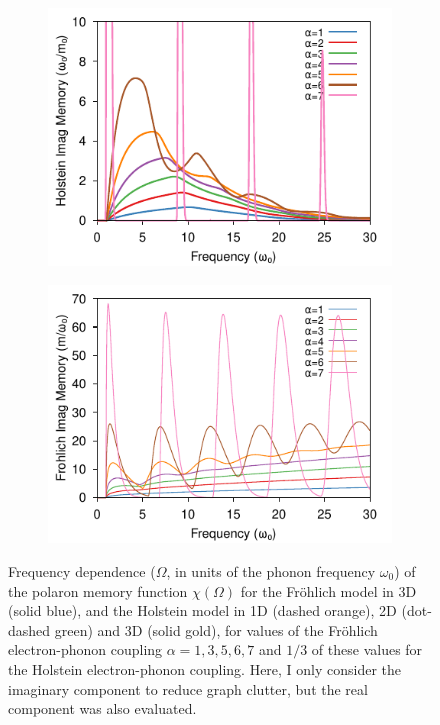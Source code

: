 \begin{figure}
\begin{subfigure}[b]{0.49\textwidth}
    \includegraphics[width=\textwidth]{figures/holstein-3d-imag-memory-freq-COLOUR.pdf}
  \end{subfigure}
  \begin{subfigure}[b]{0.49\textwidth}
    \includegraphics[width=\textwidth]{figures/frohlich-3d-imag-memory-freq-COLOUR.pdf}
  \end{subfigure}
  \caption{Frequency dependence ($\Omega$, in units of the phonon frequency $\omega_0$) of the polaron memory function $\chi(\Omega)$ for the Fr\"ohlich model in 3D (solid blue), and the Holstein model in 1D (dashed orange), 2D (dot-dashed green) and 3D (solid gold), for values of the Fr\"ohlich electron-phonon coupling $\alpha = 1, 3, 5,6, 7$ and $1/3$ of these values for the Holstein electron-phonon coupling. Here, I only consider the imaginary component to reduce graph clutter, but the real component was also evaluated.} 
  \label{fig:im_mem_freq}
\end{figure}
